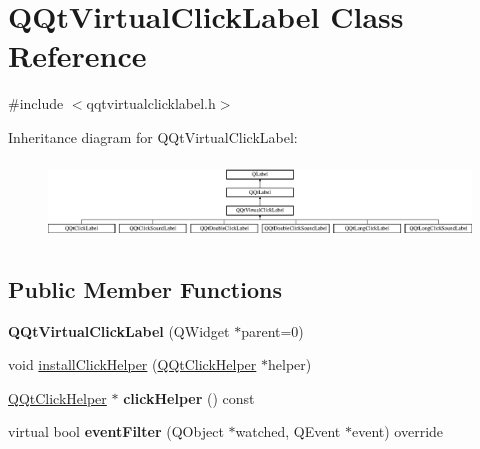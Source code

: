 \hypertarget{class_q_qt_virtual_click_label}{}\section{Q\+Qt\+Virtual\+Click\+Label Class Reference}
\label{class_q_qt_virtual_click_label}


{\ttfamily \#include $<$qqtvirtualclicklabel.\+h$>$}

Inheritance diagram for Q\+Qt\+Virtual\+Click\+Label\+:\begin{figure}[H]
\begin{center}
\leavevmode
\includegraphics[height=2.097378cm]{class_q_qt_virtual_click_label}
\end{center}
\end{figure}
\subsection*{Public Member Functions}
\begin{DoxyCompactItemize}
\item 
\mbox{\label{class_q_qt_virtual_click_label_ade5c5f064d272304618ac40fc5ad8b5a}} 
{\bfseries Q\+Qt\+Virtual\+Click\+Label} (Q\+Widget $\ast$parent=0)
\item 
void \mbox{\hyperlink{class_q_qt_virtual_click_label_af95dc641c53eda0bbb7d688046f8872d}{install\+Click\+Helper}} (\mbox{\hyperlink{class_q_qt_click_helper}{Q\+Qt\+Click\+Helper}} $\ast$helper)
\item 
\mbox{\label{class_q_qt_virtual_click_label_ad7ceb361f788ef2d5c2705063c418047}} 
\mbox{\hyperlink{class_q_qt_click_helper}{Q\+Qt\+Click\+Helper}} $\ast$ {\bfseries click\+Helper} () const
\item 
\mbox{\label{class_q_qt_virtual_click_label_a9431237555ac7c52afb088c89cb7c858}} 
virtual bool {\bfseries event\+Filter} (Q\+Object $\ast$watched, Q\+Event $\ast$event) override
\end{DoxyCompactItemize}
